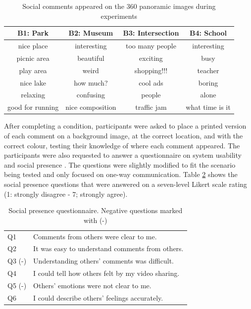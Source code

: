 \begin{table}[h]
  \centering
  \label{tbl:mgia16:comment}
  \caption{Social comments appeared on the 360 panoramic images during experiments}
  \begin{tabular}{ |c|c|c|c| } 
\hline
    B1: Park    & B2: Museum  &   B3: Intersection    &  B4: School\\
\hline
    nice place  &   interesting &  too many people & interesting \\
    picnic area &   beautiful   &  exciting  & busy \\
    play area   &   weird   &  shopping!!! & teacher \\
    nice lake   &   how much?    &  cool ads    & boring \\
    relaxing    &   confusing   &  people    & alone \\
    good for running    &   nice composition    &  traffic jam & what time is it\\\hline
  \end{tabular}
\end{table}

After completing a condition, participants were asked to place a printed version of each comment on a background image, at the correct location, and with the correct colour, testing their knowledge of where each comment appeared. The participants were also requested to answer a questionnaire on system usability \cite{brooke1996sus} and social presence \cite{Harms2004}. The questions were slightly modified to fit the scenario being tested and only focused on one-way communication. Table \ref{table:social_questions} shows the social presence questions that were answered on a seven-level Likert scale rating (1: strongly disagree - 7; strongly agree). 

\begin{table}[h]
  \centering
  \caption{Social presence questionnaire. Negative questions marked with (-)}
  \label{table:social_questions}
  \begin{tabular}{ll}
    Q1 & Comments from others were clear to me.          \\
    Q2 & It was easy to understand comments from others. \\
    Q3 (-) & Understanding others' comments was difficult.  \\
    Q4 & I could tell how others felt by my video sharing.\\
    Q5 (-) & Others' emotions were not clear to me.\\
    Q6 & I could describe others' feelings accurately.
  \end{tabular}
\end{table}

